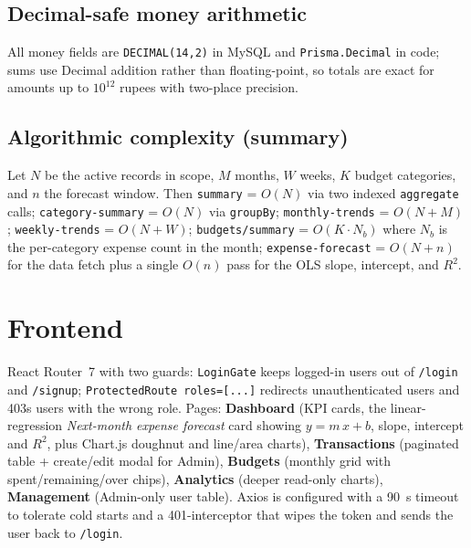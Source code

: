 \documentclass[11pt,a4paper]{article}
\newcommand{\code}[1]{\texttt{\small #1}}
\begin{document}
\subsection{Decimal-safe money arithmetic}
All money fields are \code{DECIMAL(14,2)} in MySQL and
\code{Prisma.Decimal} in code; sums use Decimal addition rather than
floating-point, so totals are exact for amounts up to
$10^{12}$ rupees with two-place precision.

\subsection{Algorithmic complexity (summary)}
Let $N$ be the active records in scope, $M$ months, $W$ weeks, $K$
budget categories, and $n$ the forecast window. Then \code{summary}
= $O(N)$ via two indexed \code{aggregate} calls;
\code{category-summary} = $O(N)$ via \code{groupBy};
\code{monthly-trends} = $O(N+M)$;
\code{weekly-trends} = $O(N+W)$;
\code{budgets/summary} = $O(K \cdot N_b)$ where $N_b$ is the
per-category expense count in the month;
\code{expense-forecast} = $O(N+n)$ for the data fetch plus a single
$O(n)$ pass for the OLS slope, intercept, and $R^2$.

\section{Frontend}
React Router~7 with two guards: \code{LoginGate} keeps logged-in users
out of \code{/login} and \code{/signup}; \code{ProtectedRoute roles=[...]}
redirects unauthenticated users and 403s users with the wrong role.
Pages: \textbf{Dashboard} (KPI cards, the linear-regression
\emph{Next-month expense forecast} card showing
$y = m\,x + b$, slope, intercept and $R^2$, plus Chart.js doughnut and
line/area charts), \textbf{Transactions} (paginated table + create/edit
modal for Admin), \textbf{Budgets} (monthly grid with
spent/remaining/over chips), \textbf{Analytics} (deeper read-only
charts), \textbf{Management} (Admin-only user table). Axios is
configured with a 90~s timeout to tolerate cold starts and a
401-interceptor that wipes the token and sends the user back to
\code{/login}.
\end{document}
